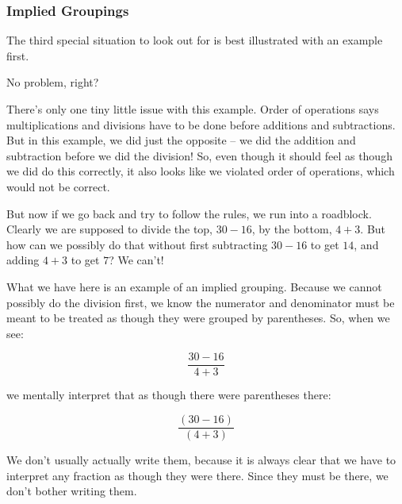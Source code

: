 
\subsubsection*{Implied Groupings}

The third special situation to look out for is best illustrated with an example first.



No problem, right?

There’s only one tiny little issue with this example. Order of operations says multiplications and divisions have to be done before additions and subtractions. But in this example, we did just the opposite – we did the addition and subtraction before we did the division! So, even though it should feel as though we did do this correctly, it also looks like we violated order of operations, which would not be correct.

But now if we go back and try to follow the rules, we run into a roadblock. Clearly we are supposed to divide the top, $30-16$, by the bottom, $4+3$. But how can we possibly do that without first subtracting $30-16$ to get $14$, and adding $4+3$ to get $7$? We can’t!

What we have here is an example of an implied grouping. Because we cannot possibly do the division first, we know the numerator and denominator must be meant to be treated as though they were grouped by parentheses. So, when we see:

$$\frac{30-16}{4+3}$$

we mentally interpret that as though there were parentheses there:

$$\frac{(30-16)}{(4+3)}$$

We don’t usually actually write them, because it is always clear that we have to interpret any fraction as though they were there. Since  they must be there, we don’t bother writing them.

